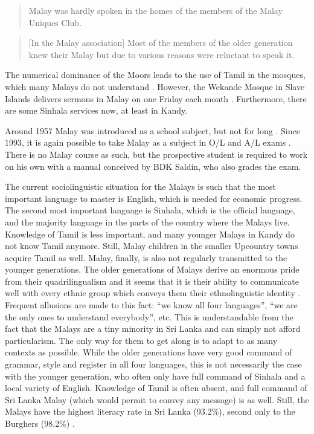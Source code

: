 \begin{quote}
     Malay was hardly spoken in the homes of the members of the Malay Uniques Club. \citep[83]{Saldin2003}
\end{quote}

\begin{quote}
    [In the Malay association] Most of the members of the older generation knew their Malay but due to various reasons were reluctant to speak it.  \citep[94]{Saldin2003}
\end{quote}


The numerical dominance of the Moors leads to the use of Tamil in the mosques, which many Malays do not understand \citep[86]{Saldin2003}. However, the Wekande Mosque in Slave Islands delivers sermons in Malay on one Friday each month \citep[86,113]{Saldin2003}. Furthermore, there are some Sinhala services now, at least in Kandy.


Around 1957 Malay was introduced as a school subject, but not for long \citep[118]{Saldin2003}. Since 1993, it is again possible to take Malay as a subject in O/L and A/L exams \citep[29]{Saldin2001}. There is no Malay course as such, but the prospective student is required to work on his own with a manual conceived by BDK Saldin, who also grades the exam.

The current sociolinguistic situation for the Malays is such that the most important language to master is English, which is needed for economic progress. The second most important language is Sinhala, which is the official language, and the majority language in the parts of the country where the Malays live. Knowledge of Tamil is less important, and many younger Malays in Kandy do not know Tamil anymore. Still, Malay children in the smaller Upcountry towns acquire  Tamil as well. Malay, finally, is also not regularly transmitted to the younger generations. The older generations of Malays derive an enormous pride from their quadrilingualism  \citep{AnsaldoEtAl2006fel,LimEtAl2007,Ansaldo2008genesis} and it seems that it is their ability to communicate well with every ethnic group which conveys them their ethnolinguistic identity \citep{Bichsel,Ansaldo2009book}. Frequent allusions are made to this fact: ``we know all four languages'', ``we are the only ones to understand everybody'', etc. This is understandable from the fact that the Malays are a tiny minority in Sri Lanka and can simply not afford particularism. The only way for them to get along is to adapt to as many contexts as possible. While the older generations have very good command of grammar, style and register in all four languages, this is not necessarily the case with the younger generation, who often only have full command of Sinhala and a  local variety of English. Knowledge of Tamil is often absent, and full command of Sri Lanka Malay (which would permit to convey any message) is as well. Still, the Malays have the highest literacy rate in Sri Lanka (93.2\%), second only to the Burghers (98.2\%) \citep[32]{Bichsel}.

